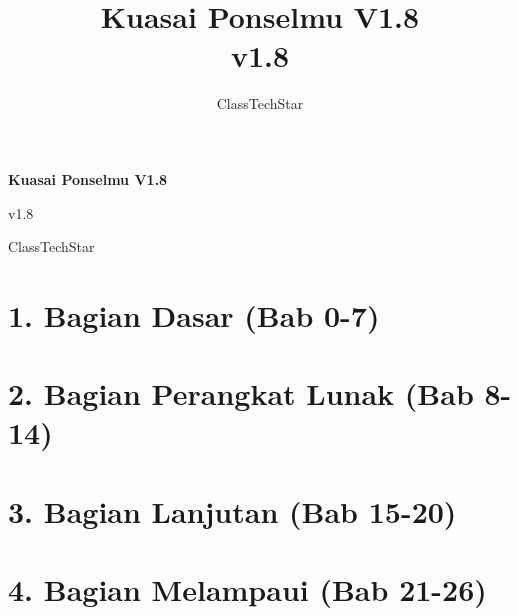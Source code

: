 \documentclass[11pt,a4paper,openany]{book}
\title{Kuasai Ponselmu V1.8\\ \large v1.8}
\author{ClassTechStar}
\date{}
\begin{document}
\begin{titlepage}
\centering
\vspace*{0.28\textheight}
{\Huge\bfseries Kuasai Ponselmu V1.8\par}
\vspace{1.2em}
{\Large v1.8\par}
\vfill
{\large ClassTechStar\par}
\end{titlepage}
\frontmatter
\tableofcontents
\mainmatter
\part*{1. Bagian Dasar (Bab 0-7)}










\part*{2. Bagian Perangkat Lunak (Bab 8-14)}








\part*{3. Bagian Lanjutan (Bab 15-20)}







\part*{4. Bagian Melampaui (Bab 21-26)}







\end{document}
